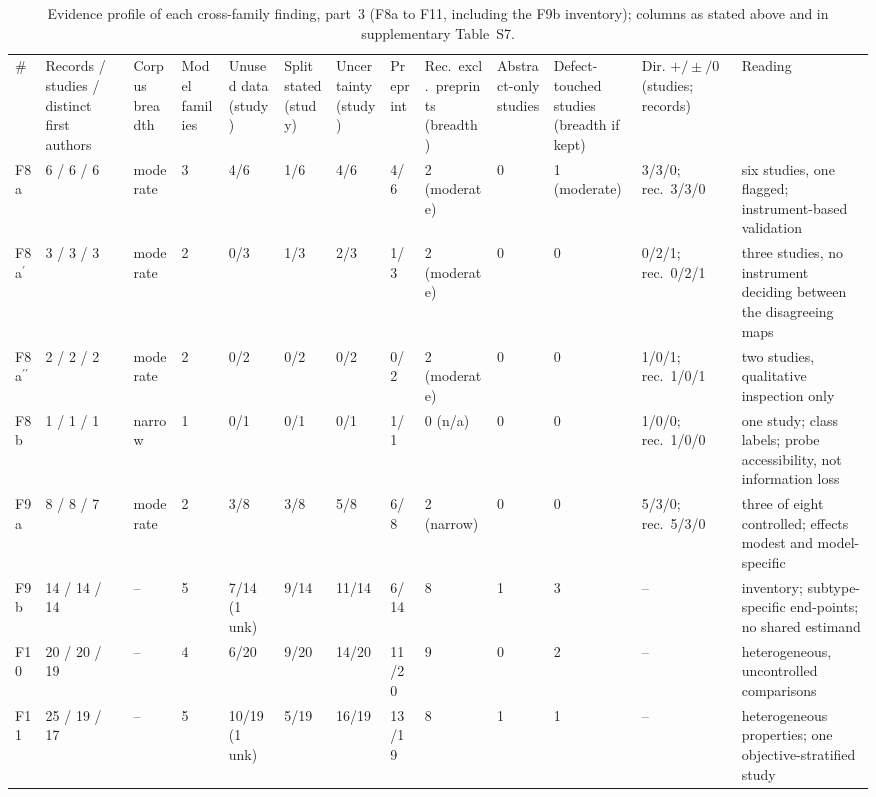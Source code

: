 \begin{table}
\centering\scriptsize\setlength\tabcolsep{2pt}\renewcommand{\arraystretch}{1.0}
\caption{Evidence profile of each cross-family finding, part~3 (F8a to F11, including the F9b inventory); columns as stated above and in supplementary Table~S7.}
\label{tab:profilec}
\begin{tabular}{@{}L{0.75cm}C{1.35cm}C{1.5cm}C{0.9cm}C{1.05cm}C{1.15cm}C{1.05cm}C{1.55cm}C{1.05cm}C{1.6cm}C{1.45cm}C{1.1cm}L{3.3cm}@{}}
\toprule
\# & Records / studies / distinct first authors & Corpus breadth & Model families & Unused data (study) & Split stated (study) & Uncertainty (study) &  Preprint & Rec.\ excl.\ preprints (breadth) & Abstract-only studies & Defect-touched studies (breadth if kept) & Dir. $+/\pm/0$ (studies; records) & Reading \\
F8a & 6 / 6 / 6 & moderate & 3 & 4/6 & 1/6 & 4/6 & 4/6 & 2 (moderate) & 0 & 1 (moderate) & 3/3/0; rec.\ 3/3/0 & six studies, one flagged; instrument-based validation \\
F8a$^{\prime}$ & 3 / 3 / 3 & moderate & 2 & 0/3 & 1/3 & 2/3 & 1/3 & 2 (moderate) & 0 & 0 & 0/2/1; rec.\ 0/2/1 & three studies, no instrument deciding between the disagreeing maps \\
F8a$^{\prime\prime}$ & 2 / 2 / 2 & moderate & 2 & 0/2 & 0/2 & 0/2 & 0/2 & 2 (moderate) & 0 & 0 & 1/0/1; rec.\ 1/0/1 & two studies, qualitative inspection only \\
F8b & 1 / 1 / 1 & narrow & 1 & 0/1 & 0/1 & 0/1 & 1/1 & 0 (n/a) & 0 & 0 & 1/0/0; rec.\ 1/0/0 & one study; class labels; probe accessibility, not information loss \\
F9a & 8 / 8 / 7 & moderate & 2 & 3/8 & 3/8 & 5/8 & 6/8 & 2 (narrow) & 0 & 0 & 5/3/0; rec.\ 5/3/0 & three of eight controlled; effects modest and model-specific \\
F9b & 14 / 14 / 14 & -- & 5 & 7/14 (1 unk) & 9/14 & 11/14 & 6/14 & 8 & 1 & 3 & -- & inventory; subtype-specific end-points; no shared estimand \\
F10 & 20 / 20 / 19 & -- & 4 & 6/20 & 9/20 & 14/20 & 11/20 & 9 & 0 & 2 & -- & heterogeneous, uncontrolled comparisons \\
F11 & 25 / 19 / 17 & -- & 5 & 10/19 (1 unk) & 5/19 & 16/19 & 13/19 & 8 & 1 & 1 & -- & heterogeneous properties; one objective-stratified study \\
\bottomrule
\end{tabular}
\end{table}
